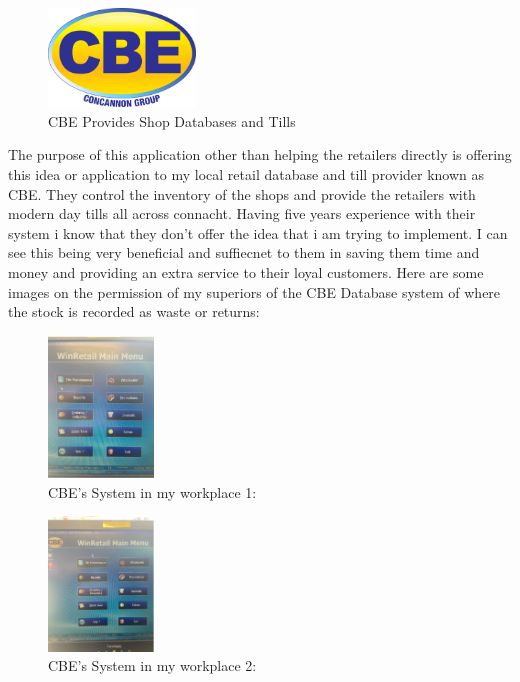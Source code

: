 \begin{figure}[h!]
	\caption{CBE Provides Shop Databases and Tills}
	\label{image:cbe}
	\centering
	\includegraphics[width=0.35\textwidth]{images/cbe.jpg}
\end{figure}

The purpose of this application other than helping the retailers directly is offering this idea or application to my local retail database and till provider known as CBE. They control the inventory of the shops and provide the retailers with modern day tills all across connacht. Having five years experience with their system i know that they don't offer the idea that i am trying to implement. I can see this being very beneficial and suffiecnet to them in saving them time and money and providing an extra service to their loyal customers. \newline
Here are some images on the permission of my superiors of the CBE Database system of where the stock is recorded as waste or returns:

\begin{figure}[h!]
	\caption{CBE's System in my workplace 1:}
	\label{image:mace1}
	\centering
	\includegraphics[width=0.25\textwidth]{images/mace1.PNG}
\end{figure}

\begin{figure}[h!]
	\caption{CBE's System in my workplace 2:}
	\label{image:mace2}
	\centering
	\includegraphics[width=0.25\textwidth]{images/mace2.PNG}
\end{figure}

